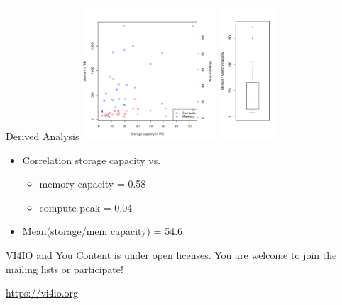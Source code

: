 \documentclass[portrait,a0paper,fontscale=0.4]{baposter}
\newcommand{\compresslist}{%
\setlength{\itemsep}{1pt}%
\setlength{\parskip}{0pt}%
\setlength{\parsep}{0pt}%
}
\begin{document}
\begin{poster}
\begin{posterbox}[name=awareness,column=3,below=engineering]{Derived Analysis}
\includegraphics[width=5cm]{capacityvscompute}
\includegraphics[width=2.15cm]{capacitymemory}

\vspace*{-2em}
\begin{itemize}\compresslist
\item Correlation storage capacity vs.
  \begin{itemize}\compresslist
  \item memory capacity = 0.58      
  \item compute peak = 0.04
  \end{itemize}
\item Mean(storage/mem capacity) = 54.6
\end{itemize}

\end{posterbox}


\begin{posterbox}[name=hpccertification,column=3,below=awareness, above=bottom]{VI4IO and You}
Content is under open licenses. 
You are welcome to join the mailing lists or participate!

\huge \url{https://vi4io.org}
\end{posterbox}


\end{poster}
\end{document}
